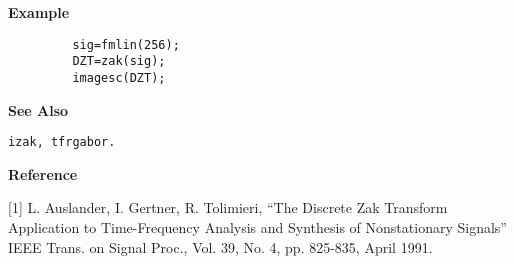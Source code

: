 {\bf \large \sf Example}
\begin{verbatim}
         sig=fmlin(256); 
         DZT=zak(sig);
         imagesc(DZT);
\end{verbatim}
\vspace*{.5cm}

{\bf \large \sf See Also}\\
\hspace*{1.5cm}
\begin{minipage}[t]{13.5cm}
\begin{verbatim}
izak, tfrgabor.
\end{verbatim}
\end{minipage}
\vspace*{.5cm}


{\bf \large \sf Reference}\\
\hspace*{1.5cm}
\begin{minipage}[t]{13.5cm}
[1] L. Auslander, I. Gertner, R. Tolimieri, ``The Discrete Zak Transform
Application to Time-Frequency Analysis and Synthesis of Nonstationary
Signals'' IEEE Trans. on Signal Proc., Vol. 39, No. 4, pp. 825-835, April
1991.
\end{minipage}

